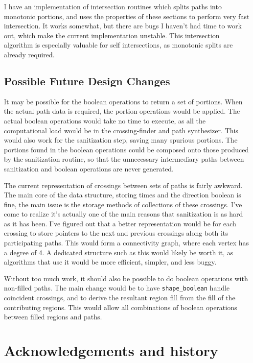 \documentclass[openany]{book}
\begin{document}
I have an implementation of intersection routines which splits paths into monotonic portions, and uses the properties of these sections to perform very fast intersection. It works somewhat, but there are bugs I haven't had time to work out, which make the current implementation unstable. This intersection algorithm is especially valuable for self intersections, as monotonic splits are already required.

\section{Possible Future Design Changes}

It may be possible for the boolean operations to return a set of portions. When the actual path data is required, the portion operations would be applied. The actual boolean operations would take no time to execute, as all the computational load would be in the crossing-finder and path synthesizer. This would also work for the sanitization step, saving many spurious portions. The portions found in the boolean operations could be composed onto those produced by the sanitization routine, so that the unnecessary intermediary paths between sanitization and boolean operations are never generated.

The current representation of crossings between sets of paths is fairly awkward. The main core of the data structure, storing times and the direction boolean is fine, the main issue is the storage methods of collections of these crossings. I've come to realize it's actually one of the main reasons that sanitization is as hard as it has been. I've figured out that a better representation would be for each crossing to store pointers to the next and previous crossings along both its participating paths. This would form a connectivity graph, where each vertex has a degree of 4. A dedicated structure such as this would likely be worth it, as algorithms that use it would be more efficient, simpler, and less buggy.

Without too much work, it should also be possible to do boolean operations with non-filled paths. The main change would be to have \verb|shape_boolean| handle coincident crossings, and to derive the resultant region fill from the fill of the contributing regions. This would allow all combinations of boolean operations between filled regions and paths. 

\chapter{Acknowledgements and history}
\end{document}
